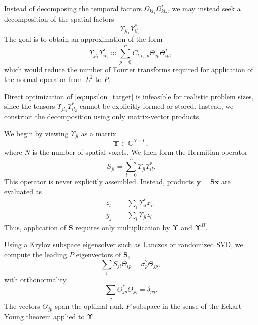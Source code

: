 \documentclass{article}
\begin{document}
Instead of decomposing the temporal factors 
$\Omega_{kl_1}\Omega^*_{kl_2}$, we may instead seek a decomposition
of the spatial factors
\begin{equation}
    \Upsilon_{jl_1}\Upsilon^*_{il_2}.
\end{equation}
The goal is to obtain an approximation of the form
\begin{equation}
    \Upsilon_{jl_1}\Upsilon^*_{il_2}
    \approx
    \sum_{p=0}^{P}
    C_{l_1l_2,p}\Theta_{jp}\Theta^*_{ip},
    \label{eq:upsilon_target}
\end{equation}
which would reduce the number of Fourier transforms required for
application of the normal operator from $L^2$ to $P$.

Direct optimization of \eqref{eq:upsilon_target} is infeasible for realistic
problem sizes, since the tensors
$\Upsilon_{jl_1}\Upsilon^*_{il_2}$ cannot be explicitly formed or stored.
Instead, we construct the decomposition using only matrix-vector products.

We begin by viewing $\Upsilon_{jl}$ as a matrix
\begin{equation}
    \mathbf{\Upsilon}\in\mathbb{C}^{N\times L},
\end{equation}
where $N$ is the number of spatial voxels.
We then form the Hermitian operator
\begin{equation}
    S_{ji}
    =
    \sum_{l=0}^{L}
    \Upsilon_{jl}\Upsilon^*_{il}.
    \label{eq:upsilon_covariance}
\end{equation}
This operator is never explicitly assembled. Instead, products
$\mathbf{y}=\mathbf{S}\mathbf{x}$ are evaluated as
\begin{align}
    z_l
    &=
    \sum_i
    \Upsilon^*_{il}x_i,
    \\
    y_j
    &=
    \sum_l
    \Upsilon_{jl}z_l.
\end{align}
Thus, application of $\mathbf{S}$ requires only multiplication by
$\mathbf{\Upsilon}$ and $\mathbf{\Upsilon}^H$.

Using a Krylov subspace eigensolver such as Lanczos or randomized SVD,
we compute the leading $P$ eigenvectors of $\mathbf{S}$,
\begin{equation}
    \sum_i
    S_{ji}\Theta_{ip}
    =
    \sigma_p^2\Theta_{jp},
\end{equation}
with orthonormality
\begin{equation}
    \sum_j
    \Theta^*_{jp}\Theta_{jq}
    =
    \delta_{pq}.
\end{equation}
The vectors $\Theta_{jp}$ span the optimal rank-$P$ subspace in the
sense of the Eckart--Young theorem applied to $\mathbf{\Upsilon}$.
\end{document}
